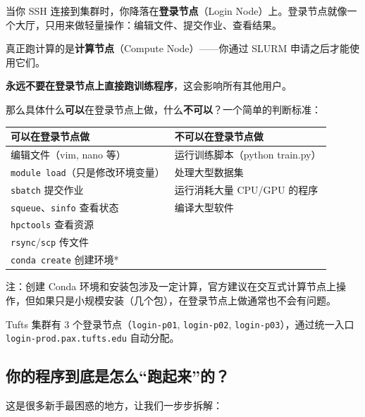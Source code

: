 \begin{conceptbox}
当你 SSH 连接到集群时，你降落在\textbf{登录节点}（Login Node）上。登录节点就像一个大厅，只用来做轻量操作：编辑文件、提交作业、查看结果。

真正跑计算的是\textbf{计算节点}（Compute Node）——你通过 SLURM 申请之后才能使用它们。

\textbf{永远不要在登录节点上直接跑训练程序}，这会影响所有其他用户。
\end{conceptbox}

那么具体什么\textbf{可以}在登录节点上做，什么\textbf{不可以}？一个简单的判断标准：

\begin{table}[h]
\centering
\begin{tabular}{lp{8cm}}
\toprule
可以在登录节点做 & 不可以在登录节点做 \\
\midrule
编辑文件（vim, nano 等） & 运行训练脚本（python train.py） \\
\texttt{module load}（只是修改环境变量） & 处理大型数据集 \\
\texttt{sbatch} 提交作业 & 运行消耗大量 CPU/GPU 的程序 \\
\texttt{squeue}、\texttt{sinfo} 查看状态 & 编译大型软件 \\
\texttt{hpctools} 查看资源 & \\
\texttt{rsync}/\texttt{scp} 传文件 & \\
\texttt{conda create} 创建环境* & \\
\bottomrule
\end{tabular}
\end{table}

\noindent *注：创建 Conda 环境和安装包涉及一定计算，官方建议在交互式计算节点上操作，但如果只是小规模安装（几个包），在登录节点上做通常也不会有问题。

Tufts 集群有 3 个登录节点（\texttt{login-p01}, \texttt{login-p02}, \texttt{login-p03}），通过统一入口 \texttt{login-prod.pax.tufts.edu} 自动分配。

\subsection{你的程序到底是怎么``跑起来''的？}

这是很多新手最困惑的地方，让我们一步步拆解：

